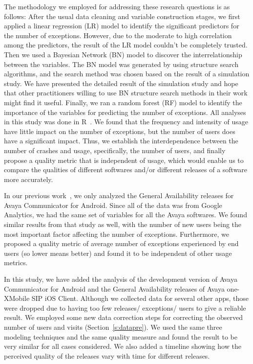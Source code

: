 \documentclass[smallcondensed]{svjour3}     %
\begin{document}
The methodology we employed for addressing these research questions is as follows: After the usual data cleaning and variable construction stages, we first applied a linear regression (LR) model to identify the significant predictors for the number of exceptions. However, due to the moderate to high correlation among the predictors, the result of the LR model couldn't be completely trusted. Then we used a Bayesian Network (BN) model to discover the interrelationship between the variables. The BN model was generated by using structure search algorithms, and the search method was chosen based on the result of a simulation study. We have presented the detailed result of the simulation study and hope that other practitioners willing to use BN structure search methods in their work might find it useful.  Finally, we ran a random forest (RF) model to identify the importance of the variables for predicting the number of exceptions. All analyses in this study was done in R~\cite{R}. We found that the frequency and intensity of usage have little impact on the number of exceptions, but the number of users does have a significant impact. Thus, we establish the interdependence between the number of crashes and usage, specifically, the number of users, and finally propose a quality metric that is independent of usage, which would enable us to compare the qualities of different softwares and/or different releases of a software more accurately. 

In our previous work~\cite{dey2018modeling}, we only analyzed the
General Availability releases for  Avaya Communicator for
Android. Since all of the data was from Google Analytics, we had
the same set of variables for all the Avaya softwares. We found
similar results from that study as well, with the number of new
users being the most important factor affecting the number of
exceptions. 
Furthermore, we proposed a quality metric of average number of
exceptions experienced by end users (so lower means better) and
found it to be independent of other usage metrics.  

In this study, we have added the analysis of the development version 
of Avaya Communicator for Android and the
General Availability releases of Avaya one-X\textregistered  Mobile
SIP iOS Client. Although we collected data for several other apps,
those were dropped due to having too few releases/ exceptions/ users
to give a reliable result. We employed some new data correction steps 
for correcting the observed number of users and visits (Section~\ref{s:datapre}).
We used the same three modeling techniques and the same quality measure
 and found the result to be very similar for all cases considered. 
We also added a timeline showing how the perceived quality of
the releases vary with time for different releases.   
\end{document}
